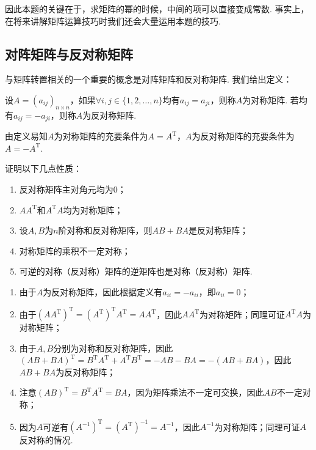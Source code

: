 因此本题的关键在于，求矩阵的幂的时候，中间的项可以直接变成常数. 事实上，在将来讲解矩阵运算技巧时我们还会大量运用本题的技巧.

\subsection{对阵矩阵与反对称矩阵}

与矩阵转置相关的一个重要的概念是对阵矩阵和反对称矩阵. 我们给出定义：
\begin{definition}{}{}
    设$A=(a_{ij})_{n \times n}$，如果$\forall i,j\in\{1,2,\ldots,n\}$均有$a_{ij}=a_{ji}$，则称$A$为对称矩阵. 若均有$a_{ij}=-a_{ji}$，则称$A$为反对称矩阵.
\end{definition}
由定义易知$A$为对称矩阵的充要条件为$A=A^\mathrm{T}$，$A$为反对称矩阵的充要条件为$A=-A^\mathrm{T}$.
\begin{example}{}{}
    证明以下几点性质：
    \begin{enumerate}
        \item 反对称矩阵主对角元均为0；

        \item $AA^\mathrm{T}$和$A^\mathrm{T}A$均为对称矩阵；

        \item 设$A,B$为$n$阶对称和反对称矩阵，则$AB+BA$是反对称矩阵；

        \item 对称矩阵的乘积不一定对称；

        \item 可逆的对称（反对称）矩阵的逆矩阵也是对称（反对称）矩阵.
    \end{enumerate}
\end{example}

\begin{solution}
    \begin{enumerate}
        \item 由于$A$为反对称矩阵，因此根据定义有$a_{ii}=-a_{ii}$，即$a_{ii}=0$；

        \item 由于$(AA^\mathrm{T})^\mathrm{T}=(A^\mathrm{T})^\mathrm{T}A^\mathrm{T}=AA^\mathrm{T}$，因此$AA^\mathrm{T}$为对称矩阵；同理可证$A^\mathrm{T}A$为对称矩阵；

        \item 由于$A,B$分别为对称和反对称矩阵，因此$(AB+BA)^\mathrm{T}=B^\mathrm{T}A^\mathrm{T}+A^\mathrm{T}B^\mathrm{T}=-AB-BA=-(AB+BA)$，因此$AB+BA$为反对称矩阵；

        \item 注意$(AB)^\mathrm{T}=B^\mathrm{T}A^\mathrm{T}=BA$，因为矩阵乘法不一定可交换，因此$AB$不一定对称；

        \item 因为$A$可逆有$(A^{-1})^\mathrm{T}=(A^\mathrm{T})^{-1}=A^{-1}$，因此$A^{-1}$为对称矩阵；同理可证$A$反对称的情况.
    \end{enumerate}
\end{solution}

